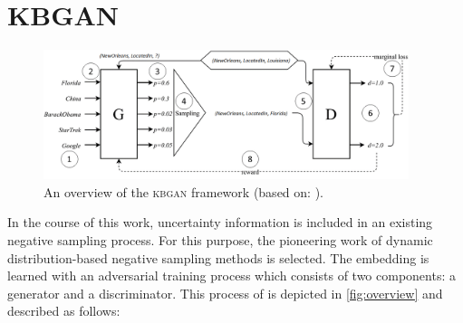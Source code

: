 \section{KBGAN} 
\label{sec:kbgan}
%
\begin{figure}[H]
  \centering
    \includegraphics[width=0.95\textwidth]{figures/kbgan_original.png}
  \caption{An overview of the \textsc{kbgan} framework (based on: \cite{cai2017kbgan}).}
  \label{fig:overview}
\end{figure}
In the course of this work, uncertainty information is included in an existing negative sampling process.
For this purpose, the pioneering work of dynamic distribution-based negative sampling methods \kbgan is selected.
The embedding is learned with an adversarial training process which consists of two components: a generator and a discriminator.
This process of \kbgan is depicted in \autoref{fig:overview} and described as follows:
